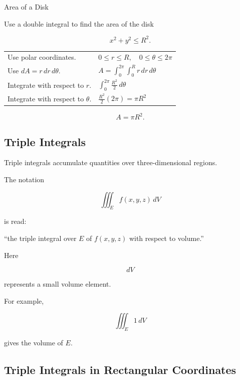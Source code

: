 \begin{workedexamplebox}{Area of a Disk}

Use a double integral to find the area of the disk

\[ x^2+y^2\leq R^2. \]

\begin{tabularx}{\textwidth}{@{}>{\raggedright\arraybackslash}p{}X@{}}
Use polar coordinates. &
\(0\leq r\leq R,\quad0\leq\theta\leq2\pi\)\\
Use \(dA=r\,dr\,d\theta\). &
\(\displaystyle A=\int_0^{2\pi}\int_0^R r\,dr\,d\theta\)\\
Integrate with respect to \(r\). &
\(\displaystyle \int_0^{2\pi}\frac{R^2}{2}\,d\theta\)\\
Integrate with respect to \(\theta\). &
\(\displaystyle \frac{R^2}{2}(2\pi)=\pi R^2\)
\end{tabularx}

\begin{answerbox}
\[ \boxed{A=\pi R^2.} \]
\end{answerbox}
\end{workedexamplebox}

\subsection{Triple Integrals}
\label{subsec:triple-integrals}

Triple integrals accumulate quantities over three-dimensional regions.

The notation

\[ \iiint_E f(x,y,z)\,dV \]

is read:

``the triple integral over \(E\) of \(f(x,y,z)\) with respect to volume.''

Here

\[ dV \]

represents a small volume element.

For example,

\[ \iiint_E1\,dV \]

gives the volume of \(E\).

\subsection{Triple Integrals in Rectangular Coordinates}
\label{subsec:triple-rectangular}

